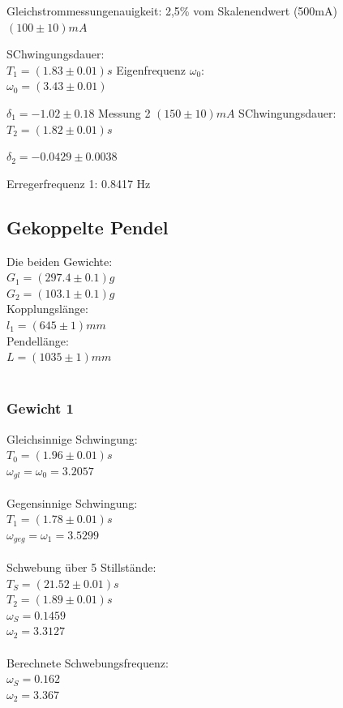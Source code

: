 \documentclass{article}
\begin{document}
Gleichstrommessungenauigkeit: 2,5\% vom Skalenendwert (500mA)\\
$(100\pm 10) \si{mA}$

SChwingungsdauer:\\
$T_1=(1.83 \pm 0.01)\si{s}$
Eigenfrequenz $\omega_0$:\\
$\omega_0=(3.43 \pm 0.01)$

$\delta_1=-1.02 \pm 0.18$
Messung 2
$(150\pm10) \si{mA}$
SChwingungsdauer:\\
$T_2=(1.82 \pm 0.01)\si{s}$

$\delta_2= -0.0429 \pm 0.0038$

Erregerfrequenz 1: 0.8417 Hz

\subsection{Gekoppelte Pendel}

Die beiden Gewichte:\\
$G_1=(297.4 \pm 0.1)\si{g}$\\
$G_2=(103.1 \pm 0.1)\si{g}$\\
Kopplungslänge:\\
$l_1=(645 \pm 1)\si{mm}$\\
Pendellänge:\\
$L=(1035 \pm 1)\si{mm}$\\
\\
\subsubsection{Gewicht 1}
Gleichsinnige Schwingung:\\
$T_0=(1.96 \pm 0.01)\si{s}$\\
$\omega_{gl}=\omega_0=3.2057$\\
\\
Gegensinnige Schwingung:\\
$T_1=(1.78 \pm 0.01)\si{s}$\\
$\omega_{geg}=\omega_1=3.5299$\\
\\
Schwebung über 5 Stillstände:\\
$T_S=(21.52 \pm 0.01)\si{s}$\\
$T_2=(1.89 \pm 0.01)\si{s}$\\
$\omega_S=0.1459$\\
$\omega_2=3.3127$\\
\\
Berechnete Schwebungsfrequenz:\\
$\omega_S=0.162$\\
$\omega_2=3.367$\\
\\
\end{document}
